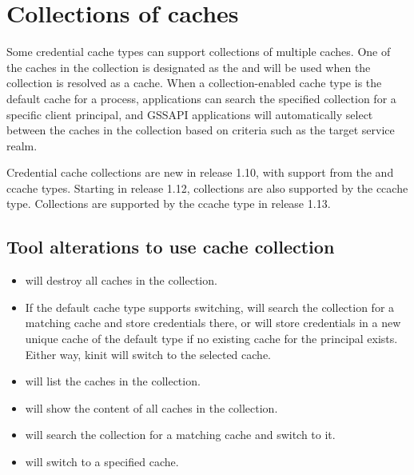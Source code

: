 \documentclass[letterpaper,10pt,english]{sphinxmanual}
\begin{document}
\section{Collections of caches}
\label{\detokenize{basic/ccache_def:collections-of-caches}}\label{\detokenize{basic/ccache_def:col-ccache}}
Some credential cache types can support collections of multiple
caches.  One of the caches in the collection is designated as the
 and will be used when the collection is resolved as a cache.
When a collection-enabled cache type is the default cache for a
process, applications can search the specified collection for a
specific client principal, and GSSAPI applications will automatically
select between the caches in the collection based on criteria such as
the target service realm.

Credential cache collections are new in release 1.10, with support
from the  and  ccache types.  Starting in release 1.12,
collections are also supported by the  ccache type.
Collections are supported by the  ccache type in release 1.13.


\subsection{Tool alterations to use cache collection}
\label{\detokenize{basic/ccache_def:tool-alterations-to-use-cache-collection}}\begin{itemize}
\item {} 
  will destroy all caches in the collection.

\item {} 
If the default cache type supports switching, 
 will search the collection for a matching cache and
store credentials there, or will store credentials in a new unique
cache of the default type if no existing cache for the principal
exists.  Either way, kinit will switch to the selected cache.

\item {} 
  will list the caches in the collection.

\item {} 
  will show the content of all caches in the
collection.

\item {} 
  will search the collection for a
matching cache and switch to it.

\item {} 
  will switch to a specified cache.

\end{itemize}
\end{document}
